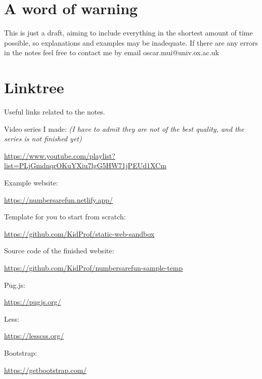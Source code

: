 \section{A word of warning}

This is just a draft, aiming to include everything in the shortest amount of time possible, so explanations and examples may be inadequate. If there are any errors in the notes feel free to contact me by email oscar.mui@univ.ox.ac.uk

\section{Linktree}

Useful links related to the notes.
\vspace{6mm}

Video series I made: \textit{(I have to admit they are not of the best quality, and the series is not finished yet)}

\url{https://www.youtube.com/playlist?list=PLjGmdnqrOKuYXiu7lgG5HW71jPEUd1XCm}
\vspace{6mm}

Example website:

\url{https://numbersarefun.netlify.app/}
\vspace{6mm}

Template for you to start from scratch:

\url{https://github.com/KidProf/static-web-sandbox}
\vspace{6mm}

Source code of the finished website:

\url{https://github.com/KidProf/numbersarefun-sample-temp}
\vspace{6mm}

Pug.js: 

\url{https://pugjs.org/}
\vspace{6mm}

Less: 

\url{https://lesscss.org/}
\vspace{6mm}

Bootstrap: 

\url{https://getbootstrap.com/}
\vspace{6mm}


